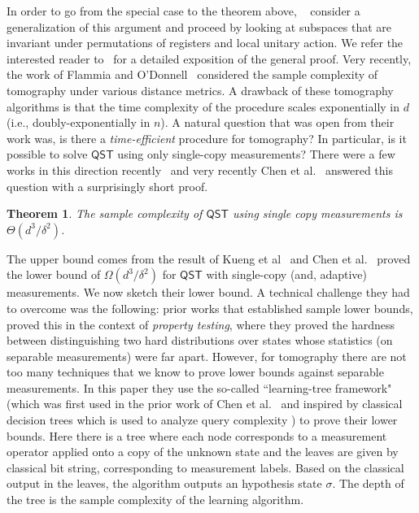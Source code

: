 \documentclass[11pt]{article}
\newtheorem{theorem}{Theorem}
\begin{document}
In order to go from the special case to the theorem above, ~\cite{haah2017sample,o2016efficient} consider  a generalization of this argument and proceed by looking at subspaces that are invariant under permutations of registers and local unitary action. We refer the interested reader to~\cite{wright2016learn,oprimer} for a detailed exposition of the general proof. Very recently, the work of Flammia and O'Donnell~\cite{flammiaodonnell} considered the sample complexity of tomography under various distance metrics. A drawback of these tomography algorithms is that the time complexity of the procedure scales exponentially in $d$ (i.e., doubly-exponentially in $n$).  A natural question that was open from their work was, is there a \emph{time-efficient} procedure for tomography? In particular, is it possible to solve $\textsf{QST}$ using only single-copy measurements? There were a few works in this direction recently~\cite{yuen2022improved,lowe2022lower} and very recently Chen et al.~\cite{chen2022tight} answered this question with a surprisingly short proof.
\begin{theorem}
\label{thm:tomographylowerbound}
The sample complexity of $\textsf{QST}$ using single copy measurements is $\Theta(d^3/\delta^2)$.
\end{theorem}
The upper bound comes from the result of Kueng et al~\cite{kueng2017low} and  Chen et al.~\cite{chen2022tight} proved the lower bound of $\Omega(d^3/\delta^2)$ for $\textsf{QST}$ with single-copy (and, adaptive) measurements. We now sketch their lower bound. A technical challenge they had to overcome was the following: prior works that established sample lower bounds, proved this in the context of \emph{property testing}, where they  proved the hardness between distinguishing two hard distributions over states whose statistics (on separable measurements) were far apart. However, for tomography there are not too many techniques that we know to prove lower bounds against separable measurements. In this paper they use the so-called ``learning-tree framework" (which was first used in the prior work of Chen et al.~\cite{DBLP:conf/focs/ChenCH021} and inspired by classical decision trees which is used to analyze query complexity \cite{buhrman2002complexity}) to prove their lower bounds.  Here there is a tree where each node corresponds to a measurement operator applied onto a copy of the unknown state and the leaves are given by  classical bit string, corresponding to measurement labels. Based on the classical output in the leaves, the algorithm outputs an hypothesis state $\sigma$. The depth of the tree is the sample complexity of the learning algorithm. %
\end{document}
